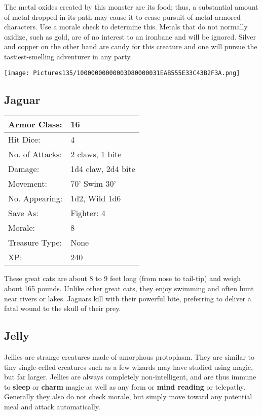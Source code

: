 \documentclass[a4paper,twoside,openany,10pt]{book}
\begin{document}
\begin{multicols}{2}
The metal oxides created by this monster are its food; thus, a substantial amount of metal dropped in its path may cause it to cease pursuit of metal-armored characters. Use a morale check to determine this.  Metals that do not normally oxidize, such as gold, are of no interest to an ironbane and will be ignored. Silver and copper on the other hand are candy for this creature and one will pursue the tastiest-smelling adventurer in any party.


\begin{center}
	\texttt{[image: Pictures135/10000000000003D80000031EAB555E33C43B2F3A.png]}
\end{center}


\subsection*{Jaguar}\label{jaguar}

\begin{tabularx}{0.50\textwidth}{@{}lX@{}}
Armor Class: & 16 \\\hline
Hit Dice: & 4 \\\hline
No. of Attacks: & 2 claws, 1 bite \\\hline
Damage: & 1d4 claw, 2d4 bite \\\hline
Movement: & 70' Swim 30' \\\hline
No. Appearing: & 1d2, Wild 1d6 \\\hline
Save As: & Fighter: 4 \\\hline
Morale: & 8 \\\hline
Treasure Type: & None \\\hline
XP: & 240 \\\hline
\end{tabularx}\medskip

These great cats are about 8 to 9 feet long (from nose to tail-tip) and weigh about 165 pounds. Unlike other great cats, they enjoy swimming and often hunt near rivers or lakes. Jaguars kill with their powerful bite, preferring to deliver a fatal wound to the skull of their prey. 

\subsection*{Jelly}\label{jelly}

Jellies are strange creatures made of amorphous protoplasm. They are similar to tiny single-celled creatures such as a few wizards may have studied using magic, but far larger. Jellies are always completely non-intelligent, and are thus immune to \textbf{sleep }or \textbf{charm }magic as well as any form or \textbf{mind reading }or telepathy. Generally they also do not check morale, but simply move toward any potential meal and attack automatically.


\end{multicols}
\end{document}
